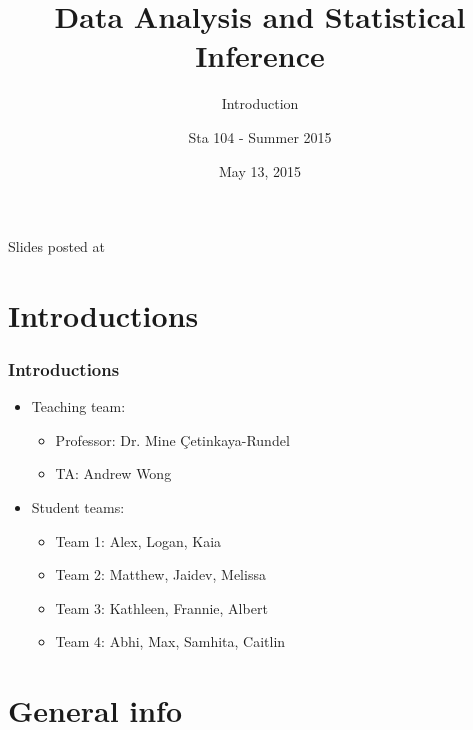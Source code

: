 \documentclass[slidestop,compress,mathserif,12pt,t,professionalfonts,xcolor=table]{beamer}
\title{Data Analysis and Statistical Inference}
\subtitle{Introduction}
\author{Sta 104 - Summer 2015}
\date{May 13, 2015}
\institute{Duke University, Department of Statistical Science}
\begin{document}



\begin{frame}[plain]

\titlepage
\vfill
{\scriptsize {} \hfill Slides posted at  \webLink{\CourseSite}{\CourseSite}}
\addtocounter{framenumber}{-1} 

\end{frame}


\section{Introductions}


\begin{frame}
\frametitle{Introductions}

\begin{itemize}

\item Teaching team:
\begin{itemize}
\item Professor: Dr. Mine \c{C}etinkaya-Rundel
\item TA: Andrew Wong
\end{itemize}

\item Student teams:
\begin{itemize}
\item Team 1: Alex, Logan, Kaia 	
\item Team 2: Matthew, Jaidev, Melissa 	
\item Team 3: Kathleen, Frannie, Albert 
\item Team 4: Abhi, Max, Samhita, Caitlin 	
\end{itemize}

\end{itemize}

\end{frame}


\section{General info}
\end{document}
